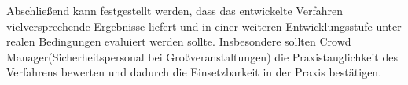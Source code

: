 Abschließend kann festgestellt werden, dass das entwickelte Verfahren vielversprechende Ergebnisse liefert und in einer weiteren Entwicklungsstufe unter realen Bedingungen evaluiert werden sollte. Insbesondere sollten Crowd Manager(Sicherheitspersonal bei Großveranstaltungen) die Praxistauglichkeit des Verfahrens bewerten und dadurch die Einsetzbarkeit in der Praxis bestätigen.

%

 
